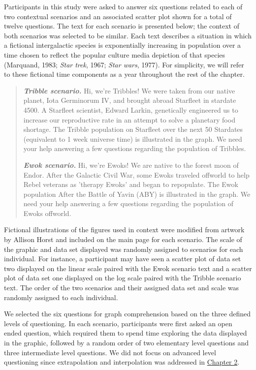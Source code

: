 \documentclass[print]{nuthesis}
\begin{document}
Participants in this study were asked to answer six questions related to each of two contextual scenarios and an associated scatter plot shown for a total of twelve questions.
The text for each scenario is presented below; the context of both scenarios was selected to be similar.
Each text describes a situation in which a fictional intergalactic species is exponentially increasing in population over a time chosen to reflect the popular culture media depiction of that species (Marquand, 1983; \emph{Star trek}, 1967; \emph{Star wars}, 1977).
For simplicity, we will refer to these fictional time components as a year throughout the rest of the chapter.

\begin{quote}
\textbf{\textit{Tribble scenario.}} Hi, we're Tribbles! We were taken from our native planet, Iota Germinorum IV, and brought abroad Starfleet in stardate 4500. A Starfleet scientist, Edward Larkin, genetically engineered us to increase our reproductive rate in an attempt to solve a planetary food shortage. The Tribble population on Starfleet over the next 50 Stardates (equivalent to 1 week universe time) is illustrated in the graph. We need your help answering a few questions regarding the population of Tribbles.

\textbf{\textit{Ewok scenario.}} Hi, we're Ewoks! We are native to the forest moon of Endor. After the Galactic Civil War, some Ewoks traveled offworld to help Rebel veterans as 'therapy Ewoks' and began to repopulate. The Ewok population After the Battle of Yavin (ABY) is illustrated in the graph. We need your help answering a few questions regarding the population of Ewoks offworld.
\end{quote}

Fictional illustrations of the figures used in context were modified from artwork by Allison Horst and included on the main page for each scenario.
The scale of the graphic and data set displayed was randomly assigned to scenarios for each individual.
For instance, a participant may have seen a scatter plot of data set two displayed on the linear scale paired with the Ewok scenario text and a scatter plot of data set one displayed on the log scale paired with the Tribble scenario text.
The order of the two scenarios and their assigned data set and scale was randomly assigned to each individual.

We selected the six questions  for graph comprehension based on the three defined levels of questioning.
In each scenario, participants were first asked an open ended question, which required them to spend time exploring the data displayed in the graphic, followed by a random order of two elementary level questions and three intermediate level questions.
We did not focus on advanced level questioning since extrapolation and interpolation was addressed in \protect\hyperlink{youdrawit}{Chapter 2}.
\end{document}
